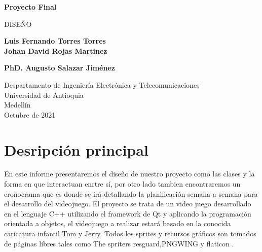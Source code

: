 \documentclass{article}
\begin{document}
\begin{titlepage}
    \begin{center}
        \vspace*{1cm}
            
        \Huge
        \textbf{Proyecto Final}
        
            
        \vspace{0.5cm}
        \LARGE
        DISEÑO
            
        \vspace{1.5cm}
            
        \textbf{Luis Fernando Torres Torres\\Johan David Rojas Martinez}
        
        \vspace{4cm}
            
        \textbf{PhD. Augusto Salazar Jiménez}
            
        \vfill
            
        \vspace{0.8cm}
            
        \Large
        Despartamento de Ingeniería Electrónica y Telecomunicaciones\\
        Universidad de Antioquia\\
        Medellín\\
        Octubre de 2021
            
    \end{center}
\end{titlepage}

\tableofcontents%
\newpage

\section{Desripción principal}\label{Descripcion}
\noindent
En este informe presentaremos el diseño de nuestro proyecto como las clases y la forma en que interactuan enrtre sí, por otro lado tambien encontraremos un cronocrama que es donde se irá detallando la planificación semana a semana para el desarrollo del videojuego. 
El proyecto se trata de un video juego desarrollado en el lenguaje C++ utilizando el framework de Qt y aplicando la programación orientada a objetos, el videojuego a realizar estará basado en la conocida caricatura infantil Tom y Jerry. Todos los sprites y recursos gráficos son tomados de páginas libres tales como The spriters resguard\cite{sprite},PNGWING \cite{monedas} y flaticon \cite{iconos}.
\end{document}
